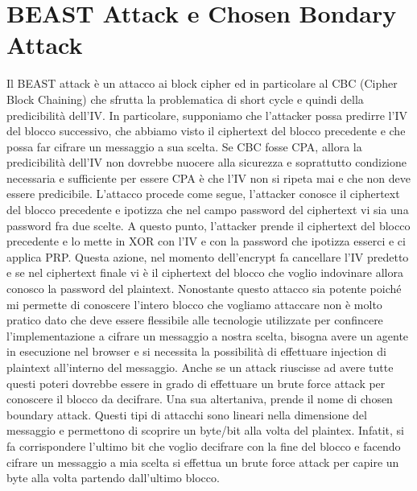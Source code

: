 \documentclass[a4paper,draft]{article}
\begin{document}
\section{BEAST Attack e Chosen Bondary Attack}
Il BEAST attack è un attacco ai block cipher ed in particolare al CBC (Cipher Block Chaining) che sfrutta la problematica di short cycle e quindi della predicibilità dell'IV\@. In particolare, supponiamo che l'attacker possa predirre l'IV del blocco successivo, che abbiamo visto il ciphertext del blocco precedente e che possa far cifrare un messaggio a sua scelta\@.\newline
Se CBC fosse CPA, allora la predicibilità dell'IV non dovrebbe nuocere alla sicurezza e soprattutto condizione necessaria e sufficiente per essere CPA è che l'IV non si ripeta mai e che non deve essere predicibile\@.\newline
L'attacco procede come segue, l'attacker conosce il ciphertext del blocco precedente e ipotizza che nel campo password del ciphertext vi sia una password fra due scelte\@. A questo punto, l'attacker prende il ciphertext del blocco precedente e lo mette in XOR con l'IV e con la password che ipotizza esserci e ci applica PRP\@. Questa azione, nel momento dell'encrypt fa cancellare l'IV predetto e se nel ciphertext finale vi è il ciphertext del blocco che voglio indovinare allora conosco la password del plaintext\@. \newline
Nonostante questo attacco sia potente poiché mi permette di conoscere l'intero blocco che vogliamo attaccare non è molto pratico dato che deve essere flessibile alle tecnologie utilizzate per confincere l'implementazione a cifrare un messaggio a nostra scelta, bisogna avere un agente in esecuzione nel browser e si necessita la possibilità di effettuare injection di plaintext all'interno del messaggio\@. Anche se un attack riuscisse ad avere tutte questi poteri dovrebbe essere in grado di effettuare un brute force attack per conoscere il blocco da decifrare\@.\newline
Una sua altertaniva, prende il nome di chosen boundary attack\@. Questi tipi di attacchi sono lineari nella dimensione del messaggio e permettono di scoprire un byte/bit alla volta del plaintex\@. Infatit, si fa corrispondere l'ultimo bit che voglio decifrare con la fine del blocco e facendo cifrare un messaggio a mia scelta si effettua un brute force attack per capire un byte alla volta partendo dall'ultimo blocco\@.
\end{document}
